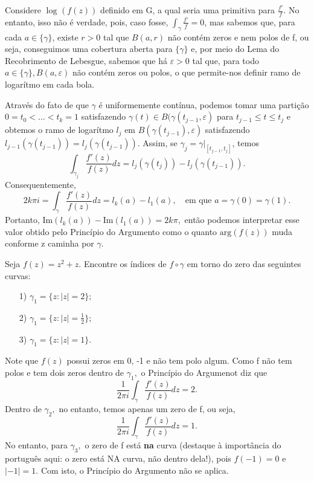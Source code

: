 \documentclass[ComplexAnalysis/complex.tex]{subfiles}
\begin{document}
\begin{example}
	Considere \(\log^{}{(f(z))}\) definido em G, a qual seria uma primitiva para \(\frac{f'}{f}.\) No entanto, isso não é verdade, pois, caso fosse,
	\(\int_{\gamma }^{}\frac{f'}{f} = 0\), mas sabemos que, para cada \(a\in\{\gamma \}\), existe \(r > 0\) tal que \(B(a, r)\) não contém zeros e nem polos de f, ou seja,
	conseguimos uma cobertura aberta para \(\{\gamma \}\) e, por meio do Lema do Recobrimento de Lebesgue,\footnotemark[1] sabemos que há \(\varepsilon > 0\) tal que, para todo \(a\in\{\gamma \}, B(a, \varepsilon )\) não
	contém zeros ou polos, o que permite-nos definir ramo de logarítmo em cada bola.

	Através do fato de que \(\gamma \) é uniformemente contínua, podemos tomar uma partição \(0 = t_{0} < \dotsc < t_{k} = 1\) satisfazendo \(\gamma (t)\in B(\gamma (t_{j-1}, \varepsilon )\) para \(t_{j-1}\leq t\leq t_{j}\) e obtemos o ramo de logarítmo
	\(l_{j}\) em \(B(\gamma (t_{j-1}), \varepsilon )\) satisfazendo \(l_{j-1}(\gamma (t_{j-1})) = l_{j}(\gamma (t_{j-1}))\). Assim, se \(\gamma_{j} = \gamma|_[t_{j-1}, t_{j}]\), temos
	\[
		\int_{\gamma_{j}}^{}\frac{f'(z)}{f(z)}dz = l_{j}(\gamma(t_{j})) - l_{j}(\gamma(t_{j-1})).
	\]
	Consequentemente,
	\[
		2k\pi i = \int_{\gamma }^{}\frac{f'(z)}{f(z)}dz = l_{k}(a) - l_{1}(a),\quad \text{em que }a=\gamma (0)=\gamma (1).
	\]
	Portanto, \(\mathrm{Im}(l_{k}(a)) - \mathrm{Im}(l_{1}(a)) = 2k\pi ,\) então podemos interpretar esse valor obtido pelo Princípio do Argumento como o quanto \(\mathrm{arg}(f(z))\) muda
	conforme z caminha por \(\gamma .\)
\end{example}
\begin{example}
	Seja \(f(z) = z^{2} + z.\) Encontre os índices de \(f\circ \gamma \) em torno do zero das seguintes curvas:
	\begin{itemize}
		\item[1)] \(\gamma_{1} = \{z: |z| = 2\}\);
		\item[2)] \(\gamma_{1} = \{z: |z| = \frac{1}{2}\}\);
		\item[3)] \(\gamma_{1} = \{z: |z| = 1\}\).
	\end{itemize}
	Note que \(f(z)\) possui zeros em 0, -1 e não tem polo algum. Como f não tem polos e tem dois zeros dentro de \(\gamma_{1},\) o Princípio do Argumenot
	diz que
	\[
		\frac{1}{2\pi i}\int_{\gamma }^{}\frac{f'(z)}{f(z)}dz = 2.
	\]
	Dentro de \(\gamma_{2},\) no entanto, temos apenas um zero de f, ou seja,
	\[
		\frac{1}{2\pi i}\int_{\gamma }^{}\frac{f'(z)}{f(z)}dz = 1.
	\]
	No entanto, para \(\gamma_{3},\) o zero de f está \textbf{na} curva (destaque à importância do português aqui: o zero está NA curva, não dentro dela!), pois \(f(-1) = 0\) e \(|-1| = 1.\) Com isto, o Princípio do Argumento
	não se aplica.
\end{example}
\end{document}
